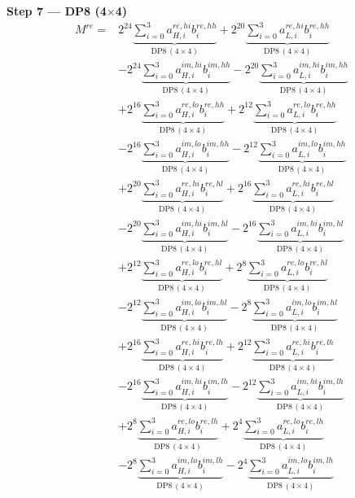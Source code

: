 \documentclass[fleqn]{article}
\newcommand{\DPop}[3]{\mathrm{DP#1}\,(#2\!\times\!#3)}
\begin{document}
\textbf{Step 7 --- DP8 (4$\times$4)}
\begin{align*}
M^{re} = {}
  & 2^{24}\underbrace{\sum_{i=0}^{3} a_{H,i}^{re,hi} b_i^{re,hh}}_{\DPop{8}{4}{4}} + 2^{20}\underbrace{\sum_{i=0}^{3} a_{L,i}^{re,hi} b_i^{re,hh}}_{\DPop{8}{4}{4}} \\[0.4em]
  & - 2^{24}\underbrace{\sum_{i=0}^{3} a_{H,i}^{im,hi} b_i^{im,hh}}_{\DPop{8}{4}{4}} - 2^{20}\underbrace{\sum_{i=0}^{3} a_{L,i}^{im,hi} b_i^{im,hh}}_{\DPop{8}{4}{4}} \\[0.4em]
  & + 2^{16}\underbrace{\sum_{i=0}^{3} a_{H,i}^{re,lo} b_i^{re,hh}}_{\DPop{8}{4}{4}} + 2^{12}\underbrace{\sum_{i=0}^{3} a_{L,i}^{re,lo} b_i^{re,hh}}_{\DPop{8}{4}{4}} \\[0.4em]
  & - 2^{16}\underbrace{\sum_{i=0}^{3} a_{H,i}^{im,lo} b_i^{im,hh}}_{\DPop{8}{4}{4}} - 2^{12}\underbrace{\sum_{i=0}^{3} a_{L,i}^{im,lo} b_i^{im,hh}}_{\DPop{8}{4}{4}} \\[0.4em]
  & + 2^{20}\underbrace{\sum_{i=0}^{3} a_{H,i}^{re,hi} b_i^{re,hl}}_{\DPop{8}{4}{4}} + 2^{16}\underbrace{\sum_{i=0}^{3} a_{L,i}^{re,hi} b_i^{re,hl}}_{\DPop{8}{4}{4}} \\[0.4em]
  & - 2^{20}\underbrace{\sum_{i=0}^{3} a_{H,i}^{im,hi} b_i^{im,hl}}_{\DPop{8}{4}{4}} - 2^{16}\underbrace{\sum_{i=0}^{3} a_{L,i}^{im,hi} b_i^{im,hl}}_{\DPop{8}{4}{4}} \\[0.4em]
  & + 2^{12}\underbrace{\sum_{i=0}^{3} a_{H,i}^{re,lo} b_i^{re,hl}}_{\DPop{8}{4}{4}} + 2^{8}\underbrace{\sum_{i=0}^{3} a_{L,i}^{re,lo} b_i^{re,hl}}_{\DPop{8}{4}{4}} \\[0.4em]
  & - 2^{12}\underbrace{\sum_{i=0}^{3} a_{H,i}^{im,lo} b_i^{im,hl}}_{\DPop{8}{4}{4}} - 2^{8}\underbrace{\sum_{i=0}^{3} a_{L,i}^{im,lo} b_i^{im,hl}}_{\DPop{8}{4}{4}} \\[0.4em]
  & + 2^{16}\underbrace{\sum_{i=0}^{3} a_{H,i}^{re,hi} b_i^{re,lh}}_{\DPop{8}{4}{4}} + 2^{12}\underbrace{\sum_{i=0}^{3} a_{L,i}^{re,hi} b_i^{re,lh}}_{\DPop{8}{4}{4}} \\[0.4em]
  & - 2^{16}\underbrace{\sum_{i=0}^{3} a_{H,i}^{im,hi} b_i^{im,lh}}_{\DPop{8}{4}{4}} - 2^{12}\underbrace{\sum_{i=0}^{3} a_{L,i}^{im,hi} b_i^{im,lh}}_{\DPop{8}{4}{4}} \\[0.4em]
  & + 2^{8}\underbrace{\sum_{i=0}^{3} a_{H,i}^{re,lo} b_i^{re,lh}}_{\DPop{8}{4}{4}} + 2^{4}\underbrace{\sum_{i=0}^{3} a_{L,i}^{re,lo} b_i^{re,lh}}_{\DPop{8}{4}{4}} \\[0.4em]
  & - 2^{8}\underbrace{\sum_{i=0}^{3} a_{H,i}^{im,lo} b_i^{im,lh}}_{\DPop{8}{4}{4}} - 2^{4}\underbrace{\sum_{i=0}^{3} a_{L,i}^{im,lo} b_i^{im,lh}}_{\DPop{8}{4}{4}} \\[0.4em]

\end{align*}
\end{document}
